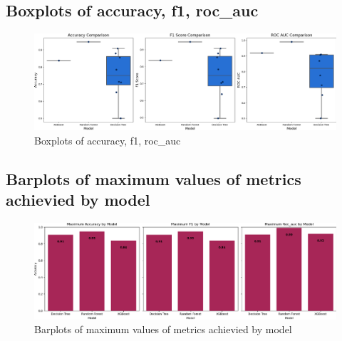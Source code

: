 \documentclass{article}%
\begin{document}
%
\newpage%
\subsection{Boxplots of accuracy, f1, roc\_auc}%
\label{subsec:Boxplotsofaccuracy,f1,rocauc}%


\begin{figure}[h!]%
\centering%
\includegraphics[width=460px]{ModelOptimization/box_plots_metrics.png}%
\caption{Boxplots of accuracy, f1, roc\_auc}%
\end{figure}

%
\subsection{Barplots of maximum values of metrics achievied by model}%
\label{subsec:Barplotsofmaximumvaluesofmetricsachieviedbymodel}%


\begin{figure}[h!]%
\centering%
\includegraphics[width=460px]{ModelOptimization/barplots_max_metric.png}%
\caption{Barplots of maximum values of metrics achievied by model}%
\end{figure}

%
\end{document}
